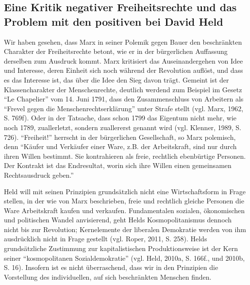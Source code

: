 \documentclass[ngerman,12pt, titlepage, smallheadings, nomath]{scrartcl}
\begin{document}
\subsection{Eine Kritik negativer Freiheitsrechte und das Problem mit
den positiven bei David
Held}\label{eine-kritik-negativer-freiheitsrechte-und-das-problem-mit-den-positiven-bei-david-held}

Wir haben gesehen, dass Marx in seiner Polemik gegen Bauer den
beschränkten Charakter der Freiheitsrechte betont, wie er in der
bürgerlichen Auffassung derselben zum Ausdruck kommt. Marx kritisiert
das Auseinandergehen von Idee und Interesse, deren Einheit sich noch
während der Revolution auflöst, und dass es das Interesse ist, das über
die Idee den Sieg davon trägt. Gemeint ist der Klassencharakter der
Menschenrechte, deutlich werdend zum Beispiel im Gesetz \enquote{Le
Chapelier} vom 14. Juni 1791, dass den Zusammenschluss von Arbeitern als
\enquote{Frevel gegen die Menschenrechtserklärung} unter Strafe stellt
(vgl. Marx, 1962, S. 769f). Oder in der Tatsache, dass schon 1799 das
Eigentum nicht mehr, wie noch 1789, zuallerletzt, sondern zuallererst
genannt wird (vgl. Klenner, 1989, S. 726). \enquote{Freiheit!} herrscht
in der bürgerlichen Gesellschaft, so Marx polemisch, denn
\enquote{Käufer und Verkäufer einer Ware, z.B. der Arbeitskraft, sind
nur durch ihren Willen bestimmt. Sie kontrahieren als freie, rechtlich
ebenbürtige Personen. Der Kontrakt ist das Endresultat, worin sich ihre
Willen einen gemeinsamen Rechtsausdruck geben.}

Held will mit seinen Prinzipien grundsätzlich nicht eine Wirtschaftsform
in Frage stellen, in der wie von Marx beschrieben, freie und rechtlich
gleiche Personen die Ware Arbeitskraft kaufen und verkaufen.
Fundamentalen sozialen, ökonomischen und politischen Wandel anvisierend,
geht Helds Kosmopolitanismus dennoch nicht bis zur Revolution;
Kernelemente der liberalen Demokratie werden von ihm ausdrücklich nicht
in Frage gestellt (vgl. Roper, 2011, S. 258). Helds grundsätzliche
Zustimmung zur kapitalistischen Produktionsweise ist der Kern seiner
\enquote{kosmopolitanen Sozialdemokratie} (vgl. Held, 2010a, S. 166f.,
und 2010b, S. 16). Insofern ist es nicht überraschend, dass wir in den
Prinzipien die Vorstellung des individuellen, auf sich beschränkten
Menschen finden.
\end{document}
